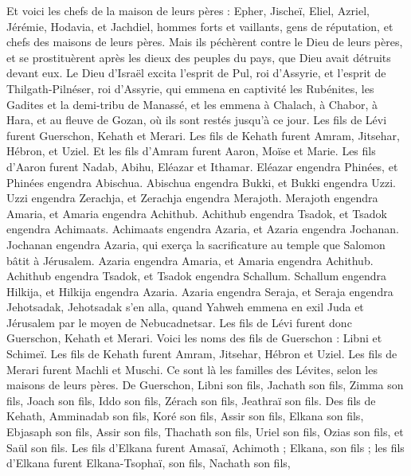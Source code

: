 \begin{multicols}{2}
Et voici les chefs de la maison de leurs pères : Epher, Jischeï, Eliel, Azriel, Jérémie, Hodavia, et Jachdiel, hommes forts et vaillants, gens de réputation, et chefs des maisons de leurs pères.
Mais ils péchèrent contre le Dieu de leurs pères, et se prostituèrent après les dieux des peuples du pays, que Dieu avait détruits devant eux.
Le Dieu d'Israël excita l'esprit de Pul, roi d'Assyrie, et l'esprit de Thilgath-Pilnéser, roi d'Assyrie, qui emmena en captivité les Rubénites, les Gadites et la demi-tribu de Manassé, et les emmena à Chalach, à Chabor, à Hara, et au fleuve de Gozan, où ils sont restés jusqu'à ce jour.
\VerseOne{}Les fils de Lévi furent Guerschon, Kehath et Merari.
Les fils de Kehath furent Amram, Jitsehar, Hébron, et Uziel.
Et les fils d'Amram furent Aaron, Moïse et Marie. Les fils d'Aaron furent Nadab, Abihu, Eléazar et Ithamar.
Eléazar engendra Phinées, et Phinées engendra Abischua.
Abischua engendra Bukki, et Bukki engendra Uzzi.
Uzzi engendra Zerachja, et Zerachja engendra Merajoth.
Merajoth engendra Amaria, et Amaria engendra Achithub.
Achithub engendra Tsadok, et Tsadok engendra Achimaats.
Achimaats engendra Azaria, et Azaria engendra Jochanan.
Jochanan engendra Azaria, qui exerça la sacrificature au temple que Salomon bâtit à Jérusalem.
Azaria engendra Amaria, et Amaria engendra Achithub.
Achithub engendra Tsadok, et Tsadok engendra Schallum.
Schallum engendra Hilkija, et Hilkija engendra Azaria.
Azaria engendra Seraja, et Seraja engendra Jehotsadak,
Jehotsadak s'en alla, quand Yahweh emmena en exil Juda et Jérusalem par le moyen de Nebucadnetsar.
Les fils de Lévi furent donc Guerschon, Kehath et Merari.
Voici les noms des fils de Guerschon : Libni et Schimeï.
Les fils de Kehath furent Amram, Jitsehar, Hébron et Uziel.
Les fils de Merari furent Machli et Muschi. Ce sont là les familles des Lévites, selon les maisons de leurs pères.
De Guerschon, Libni son fils, Jachath son fils, Zimma son fils,
Joach son fils, Iddo son fils, Zérach son fils, Jeathraï son fils.
Des fils de Kehath, Amminadab son fils, Koré son fils, Assir son fils,
Elkana son fils, Ebjasaph son fils, Assir son fils,
Thachath son fils, Uriel son fils, Ozias son fils, et Saül son fils.
Les fils d'Elkana furent Amasaï, Achimoth ;
Elkana, son fils ; les fils d'Elkana furent Elkana-Tsophaï, son fils, Nachath son fils,

\end{multicols}
